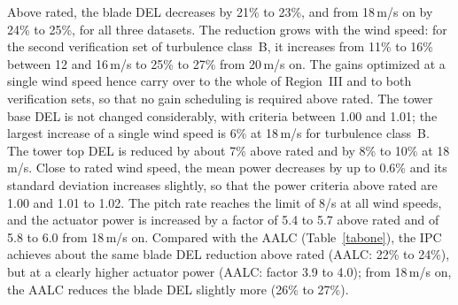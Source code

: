Above rated, the blade DEL decreases by 21\% to 23\%, and from 18\,m/s on by 24\% to 25\%, for all three datasets. The reduction grows with the wind speed: for the second verification set of turbulence class~B, it increases from 11\% to 16\% between 12 and 16\,m/s to 25\% to 27\% from 20\,m/s on. The gains optimized at a single wind speed hence carry over to the whole of Region~III and to both verification sets, so that no gain scheduling is required above rated. The tower base DEL is not changed considerably, with criteria between 1.00 and 1.01; the largest increase of a single wind speed is 6\% at 18\,m/s for turbulence class~B. The tower top DEL is reduced by about 7\% above rated and by 8\% to 10\% at 18\,m/s. Close to rated wind speed, the mean power decreases by up to 0.6\% and its standard deviation increases slightly, so that the power criteria above rated are 1.00 and 1.01 to 1.02. The pitch rate reaches the limit of 8\textdegree/s at all wind speeds, and the actuator power is increased by a factor of 5.4 to 5.7 above rated and of 5.8 to 6.0 from 18\,m/s on. Compared with the AALC (Table~\ref{tabone}), the IPC achieves about the same blade DEL reduction above rated (AALC: 22\% to 24\%), but at a clearly higher actuator power (AALC: factor 3.9 to 4.0); from 18\,m/s on, the AALC reduces the blade DEL slightly more (26\% to 27\%).

